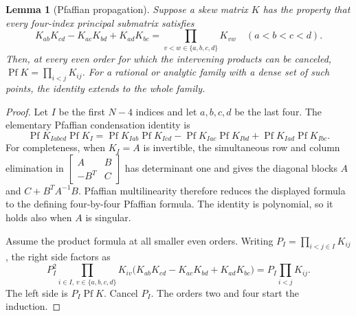 \documentclass[11pt]{article}
\numberwithin{equation}{section}
\newtheorem{lemma}[theorem]{Lemma}
\theoremstyle{remark}\newtheorem{remark}[theorem]{Remark}
\begin{document}
\begin{lemma}[Pfaffian propagation]\label{lem:pf-propagation}
Suppose a skew matrix $K$ has the property that every four-index
principal submatrix satisfies
\[
 K_{ab}K_{cd}-K_{ac}K_{bd}+K_{ad}K_{bc}
   =\prod_{v<w\in\{a,b,c,d\}}K_{vw}
 \quad(a<b<c<d).
\]
Then, at every even order for which the intervening products
can be canceled, $\operatorname{Pf}K=\prod_{i<j}K_{ij}$.
For a rational or analytic family with a dense set of such
points, the identity extends to the whole family.
\end{lemma}
\begin{proof}
Let $I$ be the first $N-4$ indices and let $a,b,c,d$ be the last
four.  The elementary Pfaffian condensation identity is
\[
 \operatorname{Pf}K_{Iabcd}\operatorname{Pf}K_I
 =\operatorname{Pf}K_{Iab}\operatorname{Pf}K_{Icd}
  -\operatorname{Pf}K_{Iac}\operatorname{Pf}K_{Ibd}
  +\operatorname{Pf}K_{Iad}\operatorname{Pf}K_{Ibc}.
\]
For completeness, when $K_I=A$ is invertible, the simultaneous
row and column elimination in
$\left[\begin{smallmatrix}A&B\\-B^T&C\end{smallmatrix}\right]$
has determinant one and gives the diagonal blocks
$A$ and $C+B^TA^{-1}B$.  Pfaffian multilinearity therefore
reduces the displayed formula to the defining four-by-four
Pfaffian formula.  The identity is polynomial, so it holds
also when $A$ is singular.

Assume the product formula at all smaller even orders.
Writing $P_I=\prod_{i<j\in I}K_{ij}$, the right side factors as
\[
 P_I^2\prod_{i\in I,\,v\in\{a,b,c,d\}}K_{iv}
 \bigl(K_{ab}K_{cd}-K_{ac}K_{bd}+K_{ad}K_{bc}\bigr)
 =P_I\prod_{i<j}K_{ij}.
\]
The left side is $P_I\operatorname{Pf}K$.  Cancel $P_I$.
The orders two and four start the induction.
\end{proof}
\end{document}
